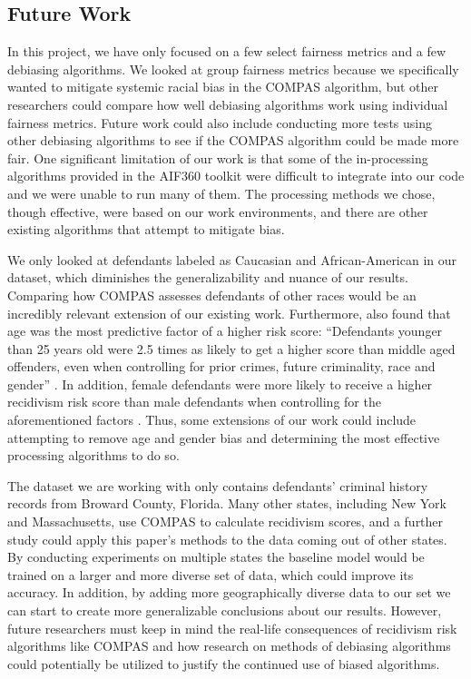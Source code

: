 \documentclass[,article,,moreauthors,pdftex]{mdpi}
\begin{document}
\hypertarget{future-work}{%
\subsection{Future Work}\label{future-work}}

In this project, we have only focused on a few select fairness metrics
and a few debiasing algorithms. We looked at group fairness metrics
because we specifically wanted to mitigate systemic racial bias in the
COMPAS algorithm, but other researchers could compare how well debiasing
algorithms work using individual fairness metrics. Future work could
also include conducting more tests using other debiasing algorithms to
see if the COMPAS algorithm could be made more fair. One significant
limitation of our work is that some of the in-processing algorithms
provided in the AIF360 toolkit were difficult to integrate into our code
and we were unable to run many of them. The processing methods we chose,
though effective, were based on our work environments, and there are
other existing algorithms that attempt to mitigate bias.

We only looked at defendants labeled as Caucasian and African-American
in our dataset, which diminishes the generalizability and nuance of our
results. Comparing how COMPAS assesses defendants of other races would
be an incredibly relevant extension of our existing work. Furthermore,
\citet{larson2016we} also found that age was the most predictive factor
of a higher risk score: ``Defendants younger than 25 years old were 2.5
times as likely to get a higher score than middle aged offenders, even
when controlling for prior crimes, future criminality, race and gender''
\citep{larson2016we}. In addition, female defendants were more likely to
receive a higher recidivism risk score than male defendants when
controlling for the aforementioned factors \citep{larson2016we}. Thus,
some extensions of our work could include attempting to remove age and
gender bias and determining the most effective processing algorithms to
do so.

The dataset we are working with only contains defendants' criminal
history records from Broward County, Florida. Many other states,
including New York and Massachusetts, use COMPAS to calculate recidivism
scores, and a further study could apply this paper's methods to the data
coming out of other states. By conducting experiments on multiple states
the baseline model would be trained on a larger and more diverse set of
data, which could improve its accuracy. In addition, by adding more
geographically diverse data to our set we can start to create more
generalizable conclusions about our results. However, future researchers
must keep in mind the real-life consequences of recidivism risk
algorithms like COMPAS and how research on methods of debiasing
algorithms could potentially be utilized to justify the continued use of
biased algorithms.
\end{document}
